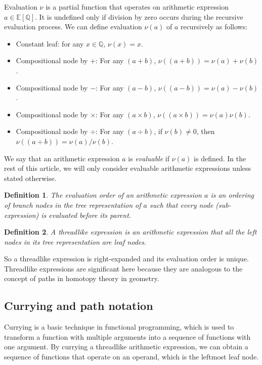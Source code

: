 \documentclass[12pt]{article}
\newtheorem{definition}{Definition}[section]
\begin{document}
Evaluation $\nu$ is a partial function that operates on arithmetic expression $a \in \mathbb{E} \left [\mathbb{Q} \right ]$.
It is undefined only if division by zero occurs during the recursive evaluation process.
We can define evaluation $\nu(a)$ of $a$ recursively as follows:
\begin{itemize}
  \item Constant leaf: for any $x \in \mathbb{Q}$, $\nu(x) = x$.
  \item Compositional node by $+$: For any $(a + b)$, $\nu((a + b)) = \nu(a) + \nu(b)$.
  \item Compositional node by $-$: For any $(a - b)$, $\nu((a - b)) = \nu(a) - \nu(b)$.
  \item Compositional node by $\times$: For any $(a \times b)$, $\nu((a \times b)) = \nu(a) \nu(b)$.
  \item Compositional node by $\div$: For any $(a \div b)$, if $\nu(b) \neq 0$, then $\nu((a \div b)) = \nu(a) / \nu(b)$.
\end{itemize}

We say that an arithmetic expression $a$ is \emph{evaluable} if $\nu(a)$ is defined.
In the rest of this article, we will only consider evaluable arithmetic expressions unless stated otherwise.

\begin{definition}
The evaluation order of an arithmetic expression $a$ is an ordering of branch nodes in the tree representation of $a$
such that every node (sub-expression) is evaluated before its parent.
\end{definition}

\begin{definition}
A threadlike expression is an arithmetic expression that all the left nodes in its tree representation are leaf nodes.
\end{definition}
So a threadlike expression is right-expanded and its evaluation order is unique.
Threadlike expressions are significant here because they are analogous to the concept of paths in homotopy theory in geometry.

\subsection{Currying and path notation}\label{subsec:currying-full}
Currying is a basic technique in functional programming\cite{Reynolds1972DefinitionalIF},
which is used to transform a function with multiple arguments into a sequence of functions with one argument.
By currying a threadlike arithmetic expression, we can obtain a sequence of functions that operate on an operand, which is the leftmost leaf node.
\end{document}
